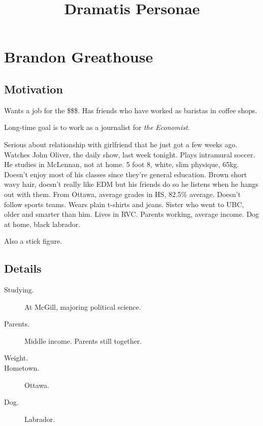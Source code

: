 \documentclass{article}
\title{Dramatis Personae}
\begin{document}
\maketitle

\section{Brandon Greathouse}

\subsection{Motivation}

Wants a job for the \$\$\$.
Has friends who have worked as baristas in coffee shops.

Long-time goal is to work as a journalist for \emph{the Economist}.

Serious about relationship with girlfriend that he just got a few weeks ago. Watches John Oliver, the daily show, last week tonight. Plays intramural soccer. He studies in McLennan, not at home. 5 foot 8, white, slim physique, 65kg. Doesn't enjoy most of his classes since they're general education. Brown short wavy hair, doesn't really like EDM but his friends do so he listens when he hangs out with them. From Ottawa, average grades in HS, 82.5\% average. Doesn't follow sports teams. Wears plain t-shirts and jeans. Sister who went to UBC, older and smarter than him. Lives in RVC. Parents working, average income. Dog at home, black labrador.

Also a stick figure.

\subsection{Details}

\begin{description}
    \item[Studying.]
        At McGill, majoring political science.
    \item[Parents.]
        Middle income. Parents still together.

    \item[Weight.]

    \item[Hometown.]
        Ottawa.

    \item[Dog.]
        Labrador.

    \item[]

\end{description}
\end{document}
